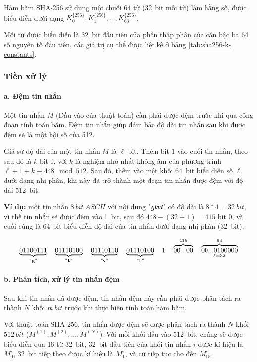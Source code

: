 Hàm băm SHA-256 sử dụng một chuỗi 64 từ (32~bit mỗi từ) làm hằng số, được biểu diễn dưới dạng $K_0^{\{256\}}, K_1^{\{256\}},..., K_{63}^{\{256\}}$. 

Mỗi từ được biểu diễn là 32~bit đầu tiên của phần thập phân của căn bậc ba 64 số nguyên tố đầu tiên, các giá trị cụ thể được liệt kê ở bảng \ref{tab:sha256-k-constants}.

\subsubsection{Tiền xử lý}

\paragraph{a. Đệm tin nhắn}\quad

Một tin nhắn $M$ (Đầu vào của thuật toán) cần phải được đệm trước khi qua công đoạn tính toán băm. Đệm tin nhắn giúp đảm bảo độ dài tin nhắn sau khi được đệm sẽ là một bội số của 512. 

Giả sử độ dài của một tin nhắn $M$ là $\ell$ bit. Thêm bit $1$ vào cuối tin nhắn, theo sau đó là $k$ bit 0, với $k$ là nghiệm nhỏ nhất không âm của phương trình $\ell+1+k\equiv 448\mod512$. Sau đó, thêm vào một khối 64~bit biểu diễn số $\ell$ dưới dạng nhị phân, khi này đã trở thành một đoạn tin nhắn được đệm với độ dài 512~bit.

\textbf{Ví dụ:} một tin nhắn $8~bit~ASCII$ với nội dung "\textbf{\textit{gtvt}}" có độ dài là $8*4 = 32~bit$, vì thế tin nhắn sẽ được đệm vào 1~bit, sau đó $448-(32+1) = 415$ bit 0, và cuối cùng là 64~bit biểu diễn độ dài của tin nhắn dưới dạng nhị phân (32~bit).

\[
\underbrace{01100111}_{\text{\textbf{"g"}}} \quad
\underbrace{01110100}_{\text{\textbf{"t"}}} \quad
\underbrace{01110110}_{\text{\textbf{"v"}}} \quad
\underbrace{01110100}_{\text{\textbf{"t"}}} \quad
1 \quad
\overbrace{00...00}^{415} \quad
\overbrace{00...0100000}^{64}_{\ell=32}
\]

\paragraph{b. Phân tích, xử lý tin nhắn đệm} \quad

Sau khi tin nhắn đã được đệm, tin nhắn đệm này cần phải được phân tách ra thành $N$ khối $m~bit$ trước khi thực hiện tính toán hàm băm.

Với thuật toán SHA-256, tin nhắn được đệm sẽ được phân tách ra thành $N$ khối $512~bit$ ($M^{(1)}, M^{(2)},...,M^{(N)}$). Với mỗi khối đầu vào 512~bit, chúng sẽ được biểu diễn qua 16 từ 32~bit, 32~bit đầu tiên của khối tin nhắn $i$ được kí hiệu là $M_0^i$, 32~bit tiếp theo được kí hiệu là $M_1^i$, và cứ tiếp tục cho đến  $M_{15}^i$.

